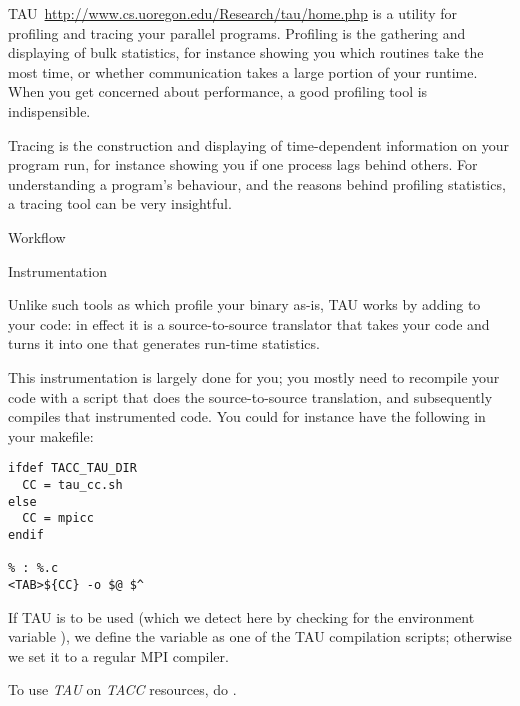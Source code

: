 

TAU~\url{http://www.cs.uoregon.edu/Research/tau/home.php} is a utility
for profiling and tracing your parallel programs. Profiling is the
gathering and displaying of bulk statistics, for instance showing you
which routines take the most time, or whether communication takes a
large portion of your runtime. When you get concerned about
performance, a good profiling tool is indispensible.

Tracing is the construction and displaying of time-dependent
information on  your program run, for instance showing you if one
process lags behind others. For understanding a program's behaviour,
and the reasons behind profiling statistics, a tracing tool can be
very insightful.

 {Workflow}

 {Instrumentation}

Unlike such tools as  which profile your binary as-is,
TAU works by adding  to your code: in
effect it is a source-to-source translator that takes your code and
turns it into one that generates run-time statistics.

This instrumentation is largely done for you; you mostly need to recompile
your code with a script that does the source-to-source translation,
and subsequently compiles that instrumented code.
You could for instance have the following in your makefile:
\begin{verbatim}
ifdef TACC_TAU_DIR
  CC = tau_cc.sh
else
  CC = mpicc
endif

% : %.c
<TAB>${CC} -o $@ $^
\end{verbatim}
If TAU is to be used (which we detect here by checking for the environment variable
), we define the  variable as
one of the TAU compilation scripts; otherwise we set it to a regular MPI compiler.

\begin{istc}
To use \emph{TAU} on \emph{TACC} resources,
do .
\end{istc}

